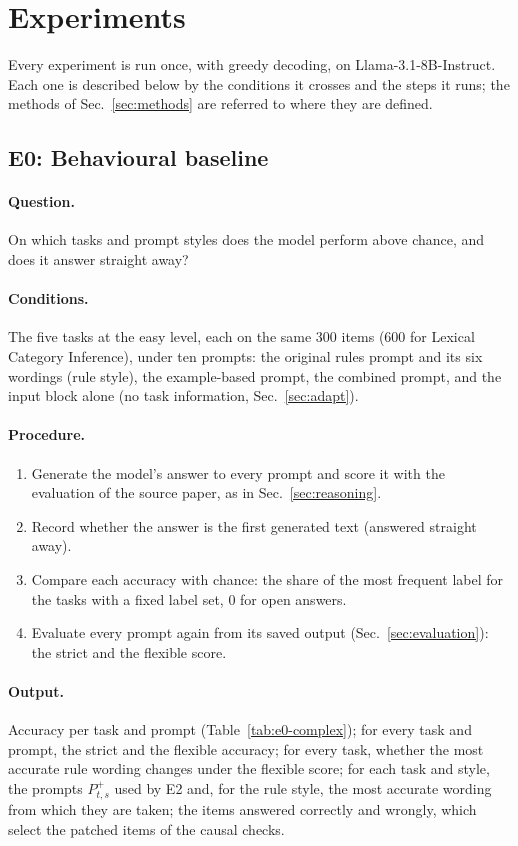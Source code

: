 \documentclass[11pt,a4paper]{article}
\begin{document}
\section{Experiments}\label{sec:experiments}
Every experiment is run once, with greedy decoding, on Llama-3.1-8B-Instruct. Each one is described below by the conditions it crosses and the steps it runs; the methods of Sec.~\ref{sec:methods} are referred to where they are defined.

\subsection{E0: Behavioural baseline}\label{sec:e0}
\paragraph{Question.} On which tasks and prompt styles does the model perform above chance, and does it answer straight away?

\paragraph{Conditions.} The five tasks at the easy level, each on the same 300 items (600 for Lexical Category Inference), under ten prompts: the original rules prompt and its six wordings (rule style), the example-based prompt, the combined prompt, and the input block alone (no task information, Sec.~\ref{sec:adapt}).

\paragraph{Procedure.}
\begin{enumerate}
\item Generate the model's answer to every prompt and score it with the evaluation of the source paper, as in Sec.~\ref{sec:reasoning}.
\item Record whether the answer is the first generated text (answered straight away).
\item Compare each accuracy with chance: the share of the most frequent label for the tasks with a fixed label set, 0 for open answers.
\item Evaluate every prompt again from its saved output (Sec.~\ref{sec:evaluation}): the strict and the flexible score.
\end{enumerate}

\paragraph{Output.} Accuracy per task and prompt (Table~\ref{tab:e0-complex}); for every task and prompt, the strict and the flexible accuracy; for every task, whether the most accurate rule wording changes under the flexible score; for each task and style, the prompts $P^{+}_{t,s}$ used by E2 and, for the rule style, the most accurate wording from which they are taken; the items answered correctly and wrongly, which select the patched items of the causal checks.
\end{document}
